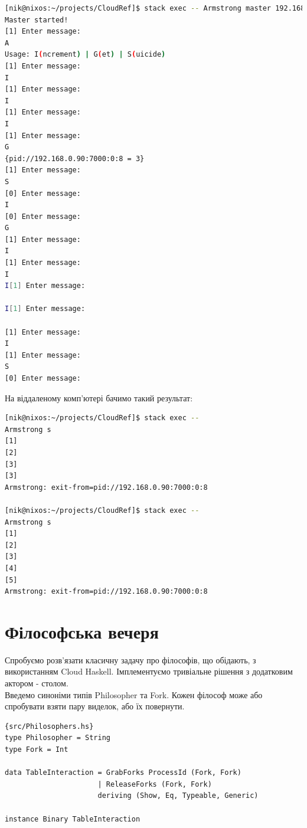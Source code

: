 \documentclass[12pt]{article}
\begin{document}
\begin{lstlisting}[language=bash, caption=Приклад використання - Мастер]
[nik@nixos:~/projects/CloudRef]$ stack exec -- Armstrong master 192.168.0.53 7000
Master started!
[1] Enter message: 
A
Usage: I(ncrement) | G(et) | S(uicide)
[1] Enter message: 
I
[1] Enter message: 
I
[1] Enter message: 
I
[1] Enter message: 
G
{pid://192.168.0.90:7000:0:8 = 3}
[1] Enter message: 
S
[0] Enter message: 
I
[0] Enter message: 
G
[1] Enter message: 
I
[1] Enter message: 
I
I[1] Enter message: 

I[1] Enter message: 

[1] Enter message: 
I
[1] Enter message: 
S
[0] Enter message:
\end{lstlisting}

На віддаленому комп'ютері бачимо такий результат:\\

\begin{lstlisting}[language=bash, caption=Приклад використання - Слейв]
[nik@nixos:~/projects/CloudRef]$ stack exec -- 
Armstrong s
[1]
[2]
[3]
[3]
Armstrong: exit-from=pid://192.168.0.90:7000:0:8

[nik@nixos:~/projects/CloudRef]$ stack exec -- 
Armstrong s
[1]
[2]
[3]
[4]
[5]
Armstrong: exit-from=pid://192.168.0.90:7000:0:8
\end{lstlisting}

\section{Філософська вечеря}

Спробуємо розв'язати класичну задачу про філософів, що обідають, з використанням 
Cloud Haskell. Імплементуємо тривіальне рішення з додатковим актором - столом.\\

Введемо синоніми типів Philosopher та Fork. Кожен філософ може або спробувати 
взяти пару виделок, або їх повернути.\\

\begin{lstlisting}{src/Philosophers.hs}
type Philosopher = String
type Fork = Int

data TableInteraction = GrabForks ProcessId (Fork, Fork)
                      | ReleaseForks (Fork, Fork)
                      deriving (Show, Eq, Typeable, Generic)

instance Binary TableInteraction  
\end{lstlisting}
\end{document}
